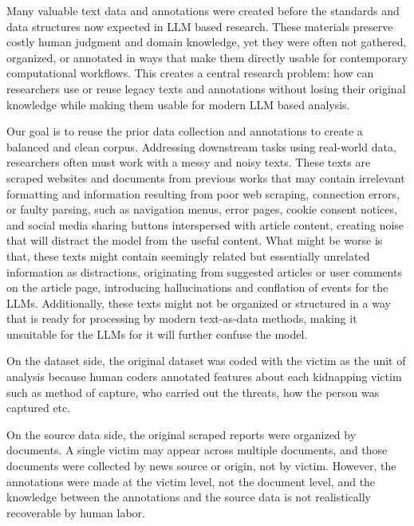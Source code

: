 \documentclass{article}
\begin{document}

Many valuable text data and annotations were created before the standards and data structures now expected in LLM based research. These materials preserve costly human judgment and domain knowledge, yet they were often not gathered, organized, or annotated in ways that make them directly usable for contemporary computational workflows. This creates a central research problem: how can researchers use or reuse legacy texts and annotations without losing their original knowledge while making them usable for modern LLM based analysis.

Our goal is to reuse the prior data collection and annotations to create a balanced and clean corpus. Addressing downstream tasks using real-world data, researchers often must work with a messy and noisy texts. These texts are scraped websites and documents from previous works that may contain irrelevant formatting and information resulting from poor web scraping, connection errors, or faulty parsing, such as navigation menus, error pages, cookie consent notices, and social media sharing buttons interspersed with article content, creating noise that will distract the model from the useful content. What might be worse is that, these texts might contain seemingly related but essentially unrelated information as distractions, originating from suggested articles or user comments on the article page, introducing hallucinations and conflation of events for the LLMs. Additionally, these texts might not be organized or structured in a way that is ready for processing by modern text-as-data methods, making it unsuitable for the LLMs for it will further confuse the model.

On the dataset side, the original dataset was coded with the victim as the unit of analysis because human coders annotated features about each kidnapping victim such as method of capture, who carried out the threats, how the person was captured etc.

On the source data side, the original scraped reports were organized by documents. A single victim may appear across multiple documents, and those documents were collected by news source or origin, not by victim. However, the annotations were made at the victim level, not the document level, and the knowledge between the annotations and the source data is not realistically recoverable by human labor.
\end{document}
